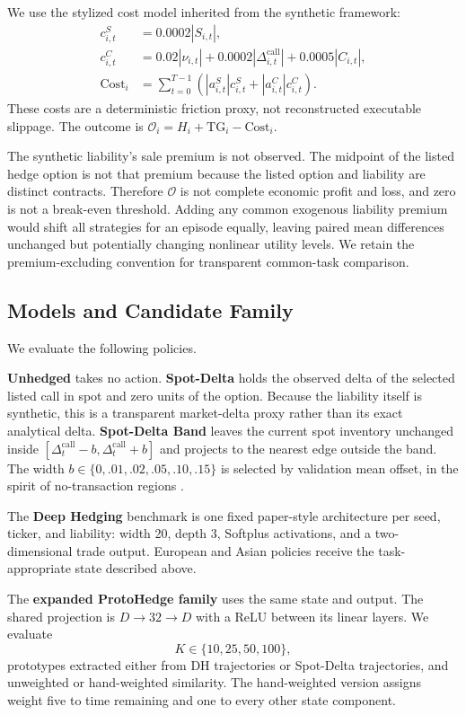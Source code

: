 \documentclass[conference]{IEEEtran}
\newcommand{\Offset}{\mathcal{O}}
\begin{document}
We use the stylized cost model inherited from the synthetic framework:
\begin{align}
c_{i,t}^{S}&=0.0002|S_{i,t}|,\\
c_{i,t}^{C}&=0.02|\nu_{i,t}|+0.0002|\Delta_{i,t}^{\mathrm{call}}|
+0.0005|C_{i,t}|,\\
\mathrm{Cost}_i&=\sum_{t=0}^{T-1}
\left(|a_{i,t}^{S}|c_{i,t}^{S}+|a_{i,t}^{C}|c_{i,t}^{C}\right).
\end{align}
These costs are a deterministic friction proxy, not reconstructed executable
slippage. The outcome is $\Offset_i=H_i+\mathrm{TG}_i-\mathrm{Cost}_i$.

The synthetic liability's sale premium is not observed. The midpoint of the
listed hedge option is not that premium because the listed option and liability
are distinct contracts. Therefore $\Offset$ is not complete economic profit
and loss, and zero is not a break-even threshold. Adding any common exogenous
liability premium would shift all strategies for an episode equally, leaving
paired mean differences unchanged but potentially changing nonlinear utility
levels. We retain the premium-excluding convention for transparent common-task
comparison.

\subsection{Models and Candidate Family}
\label{sec:models}

We evaluate the following policies.

\textbf{Unhedged} takes no action. \textbf{Spot-Delta} holds the observed delta
of the selected listed call in spot and zero units of the option. Because the
liability itself is synthetic, this is a transparent market-delta proxy rather
than its exact analytical delta. \textbf{Spot-Delta Band} leaves the current
spot inventory unchanged inside
$[\Delta_t^{\mathrm{call}}-b,\Delta_t^{\mathrm{call}}+b]$ and projects to the
nearest edge outside the band. The width
$b\in\{0,.01,.02,.05,.10,.15\}$ is selected by validation mean offset, in the
spirit of no-transaction regions \cite{whalley1997}.

The \textbf{Deep Hedging} benchmark is one fixed paper-style architecture per
seed, ticker, and liability: width 20, depth 3, Softplus activations, and a
two-dimensional trade output. European and Asian policies receive the
task-appropriate state described above.

The \textbf{expanded ProtoHedge family} uses the same state and output. The
shared projection is $D\rightarrow32\rightarrow D$ with a ReLU between its
linear layers. We evaluate
\begin{equation}
K\in\{10,25,50,100\},
\end{equation}
prototypes extracted either from DH trajectories or Spot-Delta trajectories,
and unweighted or hand-weighted similarity. The hand-weighted version assigns
weight five to time remaining and one to every other state component.
\end{document}
